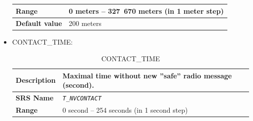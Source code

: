 \documentclass{template/openetcs}
\begin{document}
\begin{itemize}
\begin{longtable}{|l|l|}
					\begin{minipage}[t]{0.22\linewidth} \textbf{Range}	\end{minipage} 
				&	\begin{minipage}[t]{0.78\linewidth} 0 meters – 327 670 meters (in 1 meter step) \end{minipage} \\
								
				\hline
										
					\begin{minipage}[t]{0.22\linewidth} \textbf{Default value}	\end{minipage} 
				&	\begin{minipage}[t]{0.78\linewidth} 200 meters \end{minipage} \\
				
				\hline
				
			\end{longtable}
			
		\item CONTACT\_TIME:
		
			\begin{longtable}{|l|l|}
				\caption{CONTACT\_TIME}\\ 																										
				\hline
				
					\begin{minipage}[t]{0.22\linewidth} \textbf{Description}	\end{minipage} 
				&	\begin{minipage}[t]{0.78\linewidth} Maximal time without new ”safe” radio message (second). \end{minipage} \\
				
				\hline
				
					\begin{minipage}[t]{0.22\linewidth} \textbf{SRS Name}	\end{minipage} 
				&	\begin{minipage}[t]{0.78\linewidth} \emph{\texttt{T\_NVCONTACT}} \end{minipage} \\
				
				\hline
																																
					\begin{minipage}[t]{0.22\linewidth} \textbf{Range}	\end{minipage} 
				&	\begin{minipage}[t]{0.78\linewidth} 0 second – 254 seconds (in 1 second step) \end{minipage} \\
					

\end{longtable}
\end{itemize}
\end{document}

